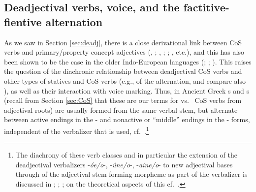 \documentclass[output=paper,colorlinks,citecolor=brown]{langscibook}
\begin{document}
\subsection{Deadjectival verbs, voice, and the factitive-fientive alternation}
\label{sec:factinch}

As we saw in Section \ref{sec:deadj}, there is a close derivational link between CoS  verbs and   primary/property concept adjectives (\citealt{HaleKeyser1998}, \citeyear{HaleKeyser2002}; \citealt{Harley2005}, \citeyear{Harley2011}; \citealt{KoontzGarboden2005}; \citealt{FrancezKoontz2017}, etc.), and this has also been shown to be the case in the older Indo-European languages (\citealt{Rau2013}; \citealt{Yakubovich2014}; \citealt{Sasseville2021}). This raises the question of the diachronic  relationship between deadjectival  CoS  verbs and other types of statives and CoS  verbs (e.g., of the  alternation, and compare also ), as well as their interaction with voice marking. Thus, in Ancient Greek  s and s (recall from Section \ref{sec:CoS}  that these are our terms for  vs.\  CoS  verbs from adjectival roots) are usually formed from the same verbal stem, but alternate between active endings in the - and nonactive or ``middle'' endings in the - forms, independent of the verbalizer that is used, cf.\ .\footnote{The diachrony of these verb classes and in particular the extension of the deadjectival verbalizers  -\textit{óe/o}-, -\textit{ū́ne/o}-, -\textit{aíne/o}- to new adjectival bases through  of the adjectival stem-forming morpheme as part of the verbalizer is discussed in \citealt{Tucker1981,Tucker1990}; \citealt[115--120, 152--155]{Rau2009}; \citealt{VillanuevaSvensson2024}; on the theoretical aspects of this  cf.\ \citealt{Grestenberger2022,Grestenberger2023}.}
\end{document}
